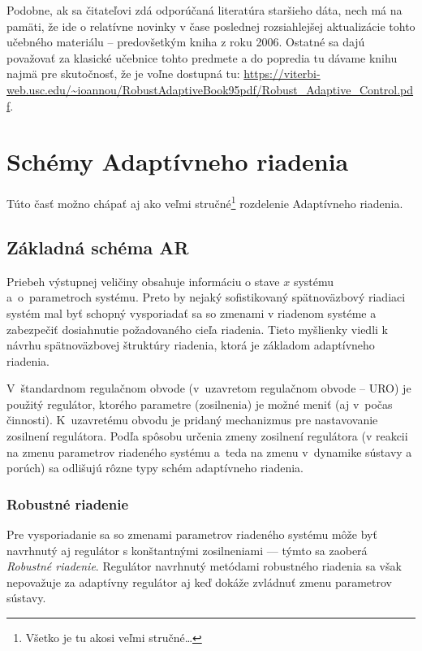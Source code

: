 \documentclass[a4paper, 10pt, ]{article}
\begin{document}
Podobne, ak sa čitateľovi zdá odporúčaná literatúra staršieho dáta, nech má na pamäti, že ide o relatívne novinky v čase poslednej rozsiahlejšej aktualizácie tohto učebného materiálu -- predovšetkým kniha \cite{Ioannou2006} z roku 2006. Ostatné sa dajú považovať za klasické učebnice tohto predmete a do popredia tu dávame knihu \cite{Ioannou1996} najmä pre skutočnosť, že je voľne dostupná tu: \url{https://viterbi-web.usc.edu/~ioannou/RobustAdaptiveBook95pdf/Robust_Adaptive_Control.pdf}.












\section{Schémy Adaptívneho riadenia}


Túto časť možno chápať aj ako veľmi stručné\footnote{Všetko je tu akosi veľmi stručné\ldots} rozdelenie Adaptívneho riadenia.


\subsection{Základná schéma AR}

Priebeh výstupnej veličiny obsahuje informáciu o stave $x$ systému a~o~parametroch systému. Preto by nejaký sofistikovaný spätnoväzbový riadiaci systém mal byť schopný vysporiadať sa so zmenami v riadenom systéme a zabezpečiť dosiahnutie požadovaného cieľa riadenia. Tieto myšlienky viedli k návrhu spätnoväzbovej štruktúry riadenia, ktorá je základom adaptívneho riadenia.

V~štandardnom regulačnom obvode (v~uzavretom regulačnom obvode -- URO) je použitý regulátor, ktorého parametre (zosilnenia) je možné meniť (aj v~počas činnosti). K~uzavretému obvodu je pridaný mechanizmus pre nastavovanie zosilnení regulátora. Podľa spôsobu určenia zmeny zosilnení regulátora (v reakcii na zmenu parametrov riadeného systému a~teda na zmenu v~dynamike sústavy a porúch) sa odlišujú rôzne typy schém adaptívneho riadenia.

\subsubsection{Robustné riadenie}

Pre vysporiadanie sa so zmenami parametrov riadeného systému môže byť navrhnutý aj regulátor s konštantnými zosilneniami --- týmto sa zaoberá \emph{Robustné riadenie}. Regulátor navrhnutý metódami robustného riadenia sa však nepovažuje za adaptívny regulátor aj keď dokáže zvládnuť zmenu parametrov sústavy.
\end{document}
